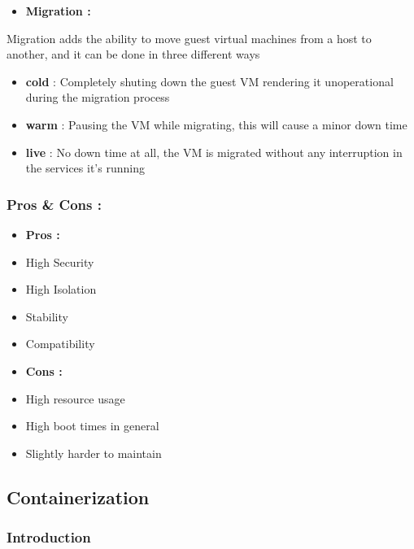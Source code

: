 \documentclass[
  14pt,
  english,
  a4paper,
]{scrreprt}
\providecommand{\tightlist}{%
  \setlength{\itemsep}{0pt}\setlength{\parskip}{0pt}}
\begin{document}
\begin{itemize}
\tightlist
\item
  \textbf{Migration :}
\end{itemize}

Migration adds the ability to move guest virtual machines from a host to
another, and it can be done in three different ways

\begin{itemize}
\tightlist
\item
  \textbf{cold} : Completely shuting down the guest VM rendering it
  unoperational during the migration process
\item
  \textbf{warm} : Pausing the VM while migrating, this will cause a
  minor down time
\item
  \textbf{live} : No down time at all, the VM is migrated without any
  interruption in the services it's running
\end{itemize}

\hypertarget{pros-cons-1}{%
\subsubsection{Pros \& Cons :}\label{pros-cons-1}}

\begin{itemize}
\item
  \textbf{Pros :}
\item
  High Security
\item
  High Isolation
\item
  Stability
\item
  Compatibility
\item
  \textbf{Cons :}
\item
  High resource usage
\item
  High boot times in general
\item
  Slightly harder to maintain
\end{itemize}

\hypertarget{containerization}{%
\subsection{Containerization}\label{containerization}}

\hypertarget{introduction-4}{%
\subsubsection{Introduction}\label{introduction-4}}
\end{document}
